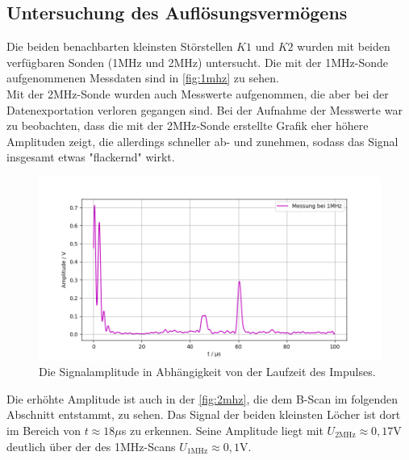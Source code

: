 \subsection{Untersuchung des Auflösungsvermögens}
Die beiden benachbarten kleinsten Störstellen $K1$ und $K2$ wurden mit beiden verfügbaren
Sonden (1MHz und 2MHz) untersucht. Die mit der 1MHz-Sonde aufgenommenen Messdaten sind in \autoref{fig:1mhz} zu sehen.\\
Mit der 2MHz-Sonde wurden auch Messwerte aufgenommen, die aber bei der Datenexportation verloren gegangen sind. 
Bei der Aufnahme der Messwerte war zu beobachten, dass die mit der 2MHz-Sonde erstellte Grafik eher höhere 
Amplituden zeigt, die allerdings schneller ab- und zunehmen, sodass das Signal insgesamt etwas "flackernd"  wirkt.
\begin{figure}[H]
  \centering
  \includegraphics[width = \textwidth]{content/1mhz_aufl_plot.png}
  \caption{Die Signalamplitude in Abhängigkeit von der Laufzeit des Impulses.}
  \label{fig:1mhz}
\end{figure}
Die erhöhte Amplitude ist auch in der \autoref{fig:2mhz}, die dem B-Scan im folgenden Abschnitt entstammt, zu sehen. Das Signal der beiden kleinsten Löcher 
ist dort im Bereich von $t \approx 18\mu$s zu erkennen. 
Seine Amplitude liegt mit $U_{\mathrm{2MHz}} \approx 0,17$V deutlich über der des 1MHz-Scans $U_{\mathrm{1MHz}} \approx 0,1$V.



